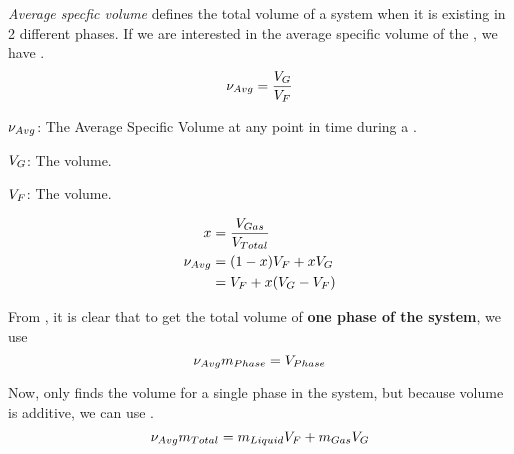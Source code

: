 \begin{definition}\label{def:Average_Specific_Volume}
  \emph{Average specfic volume} defines the total volume of a system when it is existing in 2 different phases.
  If we are interested in the average specific volume of the , we have .
  \begin{equation}\label{eq:Average_Specific_Volume}
    \nu_{Avg} = \frac{V_{G}}{V_{F}}
  \end{equation}

  \begin{description}[noitemsep]
  \item $\nu_{Avg}$: The Average Specific Volume at any point in time during a .
  \item $V_{G}$: The  volume.
  \item $V_{F}$: The  volume.
  \end{description}

  \begin{equation}\label{eq:Average_Specific_Volume_Using_Quality}
    \begin{aligned}
      x &= \frac{V_{Gas}}{V_{Total}} \\
      \nu_{Avg} &= (1 - x) V_{F} + x V_{G} \\
      &= V_{F} + x (V_{G} - V_{F})
    \end{aligned}
  \end{equation}
\end{definition}

From , it is clear that to get the total volume of \textbf{one phase of the system}, we use 
\begin{equation}\label{eq:Single_Phase_Average_Total_Volume}
  \nu_{Avg} m_{Phase} = V_{Phase}
\end{equation}

Now,  only finds the volume for a single phase in the system, but because volume is additive, we can use .
\begin{equation}\label{eq:Average_Total_Volume}
  \nu_{Avg} m_{Total} = m_{Liquid} V_{F} + m_{Gas} V_{G}
\end{equation}


